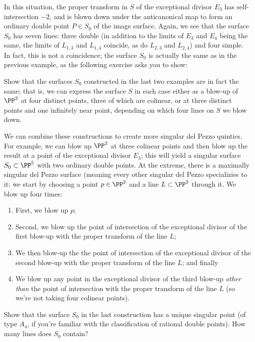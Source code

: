 In this situation, the proper transform in $S$ of the exceptional divisor $E_3$ has self-intersection $-2$, and is blown down under the anticanonical map to form an ordinary double point $P \in S_0$ of the image surface. Again, we see that the surface $S_0$ has seven lines: three double (in addition to the limits of $E_3$ and $E_4$ being the same, the limits of $L_{1,3}$ and $L_{1,4}$ coincide, as do $L_{2,3}$ and $L_{2,4}$) and four simple. In fact, this is not a coincidence; the surface $S_0$ is actually the same as in the previous example, as the following exercise asks you to show:

\begin{exercise}
Show that the surfaces $S_0$ constructed in the last two examples are in fact the same; that is, we can express the surface $S$ in each case either as a blow-up of $\PP^2$ at four distinct points, three of which are colinear, or at three distinct points and one infinitely near point, depending on which four lines on $S$ we blow down.
\end{exercise}

We can combine these constructions to create more singular del Pezzo quintics. For example, we can blow up $\PP^2$ at three colinear points and then blow up the result at a point of the exceptional divisor $E_3$; this will yield a singular surface $S_0 \subset \PP^5$ with two ordinary double points. At the extreme, there is a maximally singular del Pezzo surface (meaning every other singular del Pezzo specializies to it: we start by choosing a point $p \in \PP^2$ and a line $L \subset \PP^2$ through it. We blow up four times:

\begin{enumerate}
\item First, we blow up $p$;
\item Second, we blow up the point of intersection of the exceptional divisor of the first blow-up with the proper transform of the line $L$;
\item We then blow-up the the point of intersection of the exceptional divisor of the second blow-up with the proper transform of the line $L$; and finally
\item We blow up any point in the exceptional divisor of the third blow-up \emph{other than} the point of intersection  with the proper transform of the line $L$ (so we're not taking four colinear points).
\end{enumerate}

\begin{exercise}
Show that the surface $S_0$ in the last construction has a unique singular point (of type $A_4$, if you're familiar with the classification of rational double points). How many lines does $S_0$ contain?
\end{exercise}

